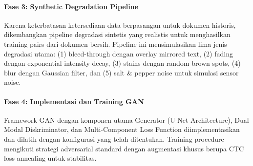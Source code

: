 \documentclass[12pt,a4paper]{article}
\begin{document}
\paragraph{Fase 3: Synthetic Degradation Pipeline}
Karena keterbatasan ketersediaan data berpasangan untuk dokumen historis, dikembangkan pipeline degradasi sintetis yang realistis untuk menghasilkan training pairs dari dokumen bersih. Pipeline ini mensimulasikan lima jenis degradasi utama: (1) bleed-through dengan overlay mirrored text, (2) fading dengan exponential intensity decay, (3) stains dengan random brown spots, (4) blur dengan Gaussian filter, dan (5) salt \& pepper noise untuk simulasi sensor noise.

\paragraph{Fase 4: Implementasi dan Training GAN}
Framework GAN dengan komponen utama Generator (U-Net Architecture), Dual Modal Diskriminator, dan Multi-Component Loss Function diimplementasikan dan dilatih dengan konfigurasi yang telah ditentukan. Training procedure mengikuti strategi adversarial standard dengan augmentasi khusus berupa CTC loss annealing untuk stabilitas.
\end{document}
